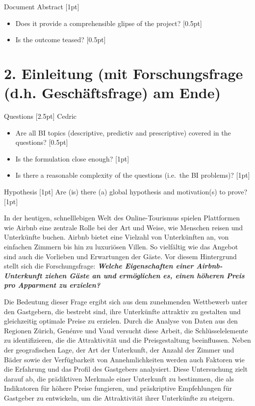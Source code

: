 \documentclass[
  journal,
]{IEEEtran}%
\begin{document}
Document Abstract {[}1pt{]}

\begin{itemize}
\item
  Does it provide a comprehensible glipse of the project? {[}0.5pt{]}
\item
  Is the outcome teased? {[}0.5pt{]}
\end{itemize}

\hypertarget{einleitung-mit-forschungsfrage-d.h.-geschuxe4ftsfrage-am-ende}{%
\section{2. Einleitung (mit Forschungsfrage (d.h. Geschäftsfrage) am
Ende)}\label{einleitung-mit-forschungsfrage-d.h.-geschuxe4ftsfrage-am-ende}}

Questions {[}2.5pt{]} Cedric

\begin{itemize}
\item
  Are all BI topics (descriptive, predictiv and prescriptive) covered in
  the questions? {[}0.5pt{]}
\item
  Is the formulation close enough? {[}1pt{]}
\item
  Is there a reasonable complexity of the questions (i.e.~the BI
  problems)? {[}1pt{]}
\end{itemize}

Hypothesis {[}1pt{]} Are (is) there (a) global hypothesis and
motivation(s) to prove? {[}1pt{]}

\hfill\break
In der heutigen, schnelllebigen Welt des Online-Tourismus spielen
Plattformen wie Airbnb eine zentrale Rolle bei der Art und Weise, wie
Menschen reisen und Unterkünfte buchen. Airbnb bietet eine Vielzahl von
Unterkünften an, von einfachen Zimmern bis hin zu luxuriösen Villen. So
vielfältig wie das Angebot sind auch die Vorlieben und Erwartungen der
Gäste. Vor diesem Hintergrund stellt sich die Forschungsfrage:
\textbf{\emph{Welche Eigenschaften einer Airbnb-Unterkunft ziehen Gäste
an und ermöglichen es, einen höheren Preis pro Apparment zu erzielen?}}

Die Bedeutung dieser Frage ergibt sich aus dem zunehmenden Wettbewerb
unter den Gastgebern, die bestrebt sind, ihre Unterkünfte attraktiv zu
gestalten und gleichzeitig optimale Preise zu erzielen. Durch die
Analyse von Daten aus den Regionen Zürich, Genénve und Vaud versucht
diese Arbeit, die Schlüsselelemente zu identifizieren, die die
Attraktivität und die Preisgestaltung beeinflussen. Neben der
geografischen Lage, der Art der Unterkunft, der Anzahl der Zimmer und
Bäder sowie der Verfügbarkeit von Annehmlichkeiten werden auch Faktoren
wie die Erfahrung und das Profil des Gastgebers analysiert. Diese
Untersuchung zielt darauf ab, die prädiktiven Merkmale einer Unterkunft
zu bestimmen, die als Indikatoren für höhere Preise fungieren, und
präskriptive Empfehlungen für Gastgeber zu entwickeln, um die
Attraktivität ihrer Unterkünfte zu steigern.
\end{document}
